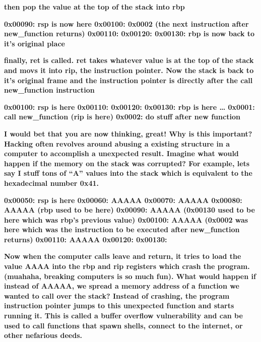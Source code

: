 \documentclass[letterpaper]{article}
\begin{document}
\textbf{then pop the value at the top of the stack into rbp}

\textbf{0x00090: rsp is now here\newline
0x00100: 0x0002 (the next instruction after new\_function returns)\newline
0x00110:\newline
0x00120:\newline
0x00130: rbp is now back to it's original place}

\textbf{finally, ret is called. ret takes whatever value is at the top of the stack and movs it into rip, the
instruction pointer. Now the stack is back to it's original frame and the instruction pointer is directly after the
call new\_function instruction}

\textbf{0x00100: rsp is here\newline
0x00110:\newline
0x00120:\newline
0x00130: rbp is here\newline
{\dots}\newline
0x0001: call new\_function\newline
(rip is here)\newline
0x0002: do stuff after new function}

\textbf{I would bet that you are now thinking, great! Why is this important? Hacking often revolves around abusing a
existing structure in a computer to accomplish a unexpected result. Imagine what would happen if the memory on the
stack was corrupted? For example, lets say I stuff tons of ``A'' values into the stack which is equivalent to the
hexadecimal number 0x41.}

\textbf{0x00050: rsp is here\newline
0x00060: AAAAA\newline
0x00070: AAAAA\newline
0x00080: AAAAA (rbp used to be here)\newline
0x00090: AAAAA (0x00130 used to be here which was rbp's previous value)\newline
0x00100: AAAAA (0x0002 was here which was the instruction to be executed after new\_function returns)\newline
0x00110: AAAAA\newline
0x00120:\newline
0x00130:}

\textbf{Now when the computer calls leave and return, it tries to load the value AAAA into the rbp and rip registers
which crash the program. (muahaha, breaking computers is so much fun). What would happen if instead of AAAAA, we spread
a memory address of a function we wanted to call over the stack? Instead of crashing, the program instruction pointer
jumps to this unexpected function and starts running it. This is called a buffer overflow vulnerability and can be used
to call functions that spawn shells, connect to the internet, or other nefarious deeds.}
\end{document}
